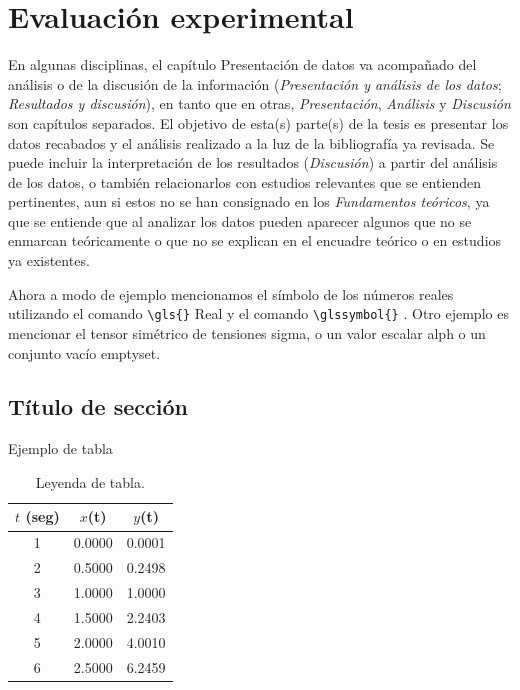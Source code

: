 \chapter{Evaluación experimental}

En algunas disciplinas, el capítulo Presentación de datos va acompañado del análisis o de la discusión de la información (\textit{Presentación y análisis de los datos}; \textit{Resultados y discusión}), en tanto que en otras, \textit{Presentación}, \textit{Análisis} y \textit{Discusión} son capítulos separados.
El objetivo de esta(s) parte(s) de la tesis es presentar los datos recabados y el análisis realizado a la luz de la bibliografía ya revisada. Se puede incluir la interpretación de los resultados (\textit{Discusión}) a partir del análisis de los datos, o también relacionarlos con estudios relevantes que se entienden pertinentes, aun si estos no se han consignado en los \textit{Fundamentos teóricos}, ya que se entiende que al analizar los datos pueden aparecer algunos que no se enmarcan teóricamente o que no se explican en el encuadre teórico o en estudios ya existentes.

Ahora a modo de ejemplo mencionamos el símbolo de los números reales utilizando el comando \verb|\gls{}| \gls{Real} y el comando \verb|\glssymbol{}| . Otro ejemplo es mencionar el tensor simétrico de tensiones \gls{sigma}, o un valor escalar  \gls{alph} o un conjunto vacío \gls{emptyset}.

\newpage 


\section{Título de sección}

Ejemplo de tabla

\begin{table}[h!]
\centering
\caption{Leyenda de tabla.}
\label{tab:comp}
\begin{tabular}{|c|c|c|}
  \hline
  $t$ (seg) & $x$(t) & $y$(t)\\
  \hline
  1 & 0.0000 & 0.0001\\
  2 & 0.5000 & 0.2498\\
  3 & 1.0000 & 1.0000\\
  4 & 1.5000 & 2.2403\\
  5 & 2.0000 & 4.0010\\
  6 & 2.5000 & 6.2459\\
  \hline
\end{tabular}
\end{table}

